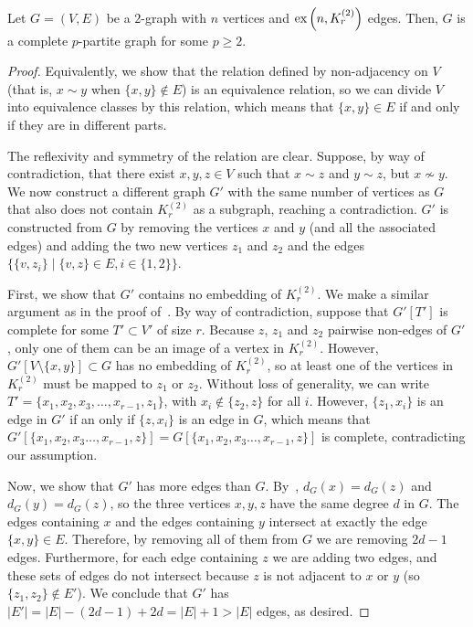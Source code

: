 \begin{lemma} \label{lem:turan_complete_partite}
    Let $G = (V, E)$ be a $2$-graph with $n$ vertices and
    $\text{ex} \left( n, K^{(2)}_{r} \right)$ edges.
    Then, $G$ is a complete $p$-partite graph for some $p \geq 2$.
    \begin{proof}
        Equivalently, we show that the relation defined by non-adjacency on $V$ (that is, $x \sim y$ when
        $\{x, y\} \notin E$) is an equivalence relation, so we can divide $V$ into equivalence classes
        by this relation, which means that $\{x, y\} \in E$ if and only if they are in different parts.

        The reflexivity and symmetry of the relation are clear.
        Suppose, by way of contradiction, that there exist $x, y, z \in V$ such that
        $x \sim z$ and $y \sim z$, but $x \nsim y$.
        We now construct a different graph $G'$ with the same number of vertices as $G$
        that also does not contain $K_r^{(2)}$ as a subgraph, reaching a contradiction.
        $G'$ is constructed from $G$ by removing the vertices
        $x$ and $y$ (and all the associated edges) and adding the two new vertices
        $z_1$ and $z_2$ and the edges $\{\{v, z_i\} \mid \{v, z\} \in E, i \in \{1, 2\}\}$.

        First, we show that $G'$ contains no embedding of $K_r^{(2)}$.
        We make a similar argument as in the proof of~.
        By way of contradiction, suppose that $G'[T']$ is complete for some $T' \subset V'$ of size $r$.
        Because $z$, $z_1$ and $z_2$ pairwise non-edges of $G'$, only one of them can be
        an image of a vertex in $K_r^{(2)}$.
        However, $G'[V \setminus \{x, y\}] \subset G$ has no embedding of $K_r^{(2)}$,
        so at least one of the vertices in $K_r^{(2)}$ must be mapped to $z_1$ or $z_2$.
        Without loss of generality, we can write $T' = \{x_1, x_2, x_3, \dots, x_{r-1}, z_1\}$,
        with $x_i \notin \{z_2, z\}$ for all $i$.
        However, $\{z_1, x_i\}$ is an edge in $G'$ if an only if $\{z, x_i\}$ is an edge in $G$,
        which means that $G'[\{x_1, x_2, x_3 \dots, x_{r-1}, z\}] = G[\{x_1, x_2, x_3 \dots, x_{r-1}, z\}]$ is complete,
        contradicting our assumption.

        Now, we show that $G'$ has more edges than $G$.
        By~, $d_G(x) = d_G(z)$ and $d_G(y) = d_G(z)$,
        so the three vertices $x, y, z$ have the same degree $d$ in $G$.
        The edges containing $x$ and the edges containing $y$ intersect at exactly the edge $\{x, y\} \in E$.
        Therefore, by removing all of them from $G$ we are removing $2d - 1$ edges.
        Furthermore, for each edge containing $z$ we are adding two edges,
        and these sets of edges do not intersect because $z$ is not adjacent to $x$ or $y$ (so $\{z_1, z_2\} \notin E'$).
        We conclude that $G'$ has $|E'| = |E| - (2d - 1) + 2d = |E| + 1 > |E| $ edges, as desired.
    \end{proof}
\end{lemma}

